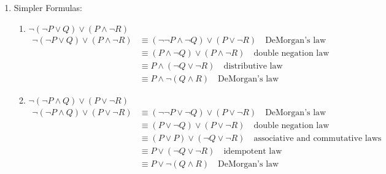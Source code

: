 \begin{enumerate}
\begin{enumerate}
  \item $\neg (P \land \neg Q) \lor (\neg P \land Q)$ \\
    \begin{align*}
      \neg (P \land \neg Q) \lor (\neg P \land Q) &\equiv (\neg P \lor \neg \neg Q) \lor (\neg P \land Q) \quad \text{DeMorgan's law} \\
      &\equiv (\neg P \lor Q) \lor (\neg P \land Q) \quad \text{double negation law} \\
      &\equiv \neg P \lor (Q \lor (\neg P \land Q)) \quad \text{associative law} \\
      &\equiv \neg P \lor ((Q \lor \neg P) \land (Q \lor Q)) \quad \text{distributive law} \\
      &\equiv \neg P \lor ((Q \lor \neg P) \land Q) \quad \text{idempotent law} \\
      &\equiv \neg P \lor Q \quad \text{absorption law}
    \end{align*}
  \end{enumerate}

\item Simpler Formulas:
  \begin{enumerate}
  \item $\neg (\neg P \lor Q) \lor (P \land \neg R)$ \\
    \begin{align*}
      \neg (\neg P \lor Q) \lor (P \land \neg R) &\equiv (\neg \neg P \land \neg Q) \lor (P \lor \neg R) \quad \text{DeMorgan's law} \\
      &\equiv (P \land \neg Q) \lor (P \land \neg R) \quad \text{double negation law} \\
      &\equiv P \land (\neg Q \lor \neg R) \quad \text{distributive law} \\
      &\equiv P \land \neg(Q \land R) \quad \text{DeMorgan's law}
    \end{align*}

  \item $\neg (\neg P \land Q) \lor (P \lor \neg R)$ \\
    \begin{align*}
      \neg (\neg P \land Q) \lor (P \lor \neg R) &\equiv (\neg \neg P \lor \neg Q) \lor (P \lor \neg R) \quad \text{DeMorgan's law} \\
      &\equiv (P \lor \neg Q) \lor (P \lor \neg R) \quad \text{double negation law} \\
      &\equiv (P \lor P) \lor (\neg Q \lor \neg R) \quad \text{associative and commutative laws} \\
      &\equiv P \lor (\neg Q \lor \neg R) \quad \text{idempotent law} \\ 
      &\equiv P \lor \neg (Q \land R) \quad \text{DeMorgan's law}
    \end{align*}


\end{enumerate}
\end{enumerate}
